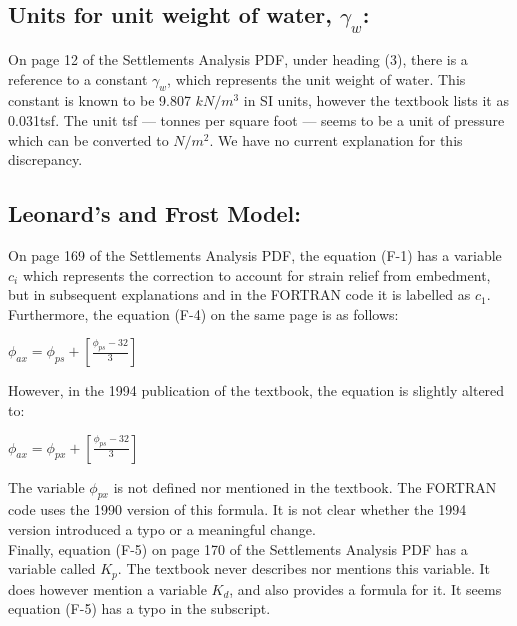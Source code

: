 \documentclass[11pt,fleqn]{article}
\newcommand{\indentpar}{\phantom{=}}
\begin{document}
    \subsection*{Units for unit weight of water, $\gamma_w$:} 
    \indentpar On page 12 of the Settlements Analysis PDF, 
    under heading (3), there is a reference to a constant $\gamma_w$, 
    which represents the unit weight of water. This constant is known
    to be 9.807 $kN/m^3$ in SI units, however the textbook lists it as 
    0.031tsf. The unit tsf — tonnes per square foot — seems to be a unit
    of pressure which can be converted to $N/m^2$. We have no current 
    explanation for this discrepancy.
    \subsection*{Leonard's and Frost Model:}
    \indentpar On page 169 of the Settlements Analysis PDF, 
    the equation (F-1) has a variable $c_i$ which represents 
    the correction to account for strain relief from embedment,
    but in subsequent explanations and in the FORTRAN code it 
    is labelled as $c_1$. \\
    \indentpar Furthermore, the equation (F-4) on the 
    same page is as follows:
    \begin{center}
        $\phi_{ax} = \phi_{ps} + [\frac{\phi_{ps} - 32}{3}]$
    \end{center}
    \indentpar However, in the 1994 publication of the textbook, the equation
    is slightly altered to:
    \begin{center}
        $\phi_{ax} = \phi_{px} + [\frac{\phi_{ps} - 32}{3}]$
    \end{center}
    \indentpar The variable $\phi_{px}$ is not defined nor mentioned in the textbook. 
    The FORTRAN code uses the 1990 version of this formula. It is not clear
    whether the 1994 version introduced a typo or a meaningful change. \\
    \indentpar Finally, equation (F-5) on page 170 of the Settlements 
    Analysis PDF has a variable called $K_p$. The textbook never describes 
    nor mentions this variable. It does however mention a variable $K_d$, and also
    provides a formula for it. It seems equation (F-5) has a typo in the subscript.
     
\end{document}
